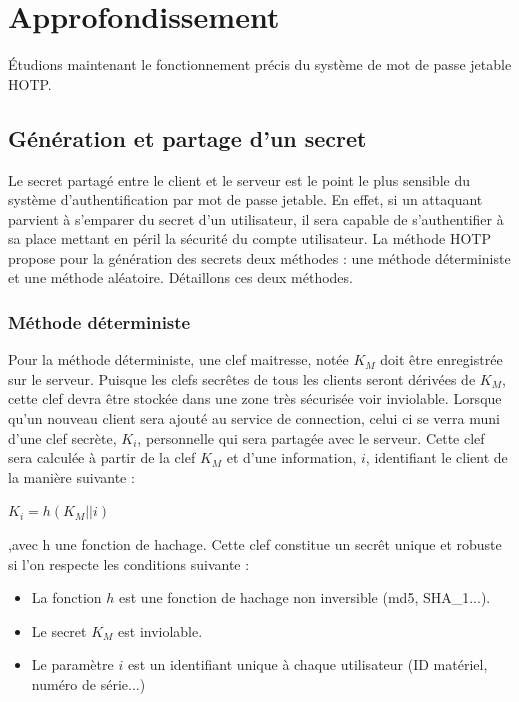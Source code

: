 \documentclass{../res/univ-projet}
\begin{document}
\section{Approfondissement}
  Étudions maintenant le fonctionnement précis du système de mot de passe jetable \og{}HOTP\fg{}.
  \subsection{Génération et partage d'un secret}
    Le secret partagé entre le client et le serveur est le point le plus sensible du système d'authentification par mot de passe jetable. En effet, si un attaquant 
    parvient à s'emparer du secret d'un utilisateur, il sera capable de s'authentifier à sa place mettant en péril la sécurité du compte utilisateur. La méthode 
    \og{}HOTP\fg{} propose pour la génération des secrets deux méthodes : une méthode déterministe et une méthode aléatoire. Détaillons ces deux méthodes.
    
    \subsubsection{Méthode déterministe}
    Pour la méthode déterministe, une clef maitresse, notée $K_M$ doit \^etre enregistrée sur le serveur. Puisque les clefs secr\^etes de tous les clients seront dérivées 
    de $K_M$, cette clef devra \^etre stockée dans une zone très sécurisée voir inviolable. Lorsque qu'un nouveau client sera ajouté au service de connection, celui ci
    se verra muni d'une clef secrète, $K_i$, personnelle qui sera partagée avec le serveur. Cette clef sera calculée à partir de la clef $K_M$ et d'une information, $i$, 
    identifiant le client de la manière suivante : \newline
    \begin{center}
     $K_i = h(K_M || i)$ 
    \end{center}
    \hfill{},avec h une fonction de hachage.\newline
    Cette clef constitue un secr\^et unique et robuste si l'on respecte les conditions suivante :
    \begin{itemize}
     \item La fonction $h$ est une fonction de hachage non inversible (md5, SHA\_1...).
     \item Le secret $K_M$ est inviolable.
     \item Le paramètre $i$ est un identifiant unique à chaque utilisateur (ID matériel, numéro de série...)
    \end{itemize}
    
\end{document}
